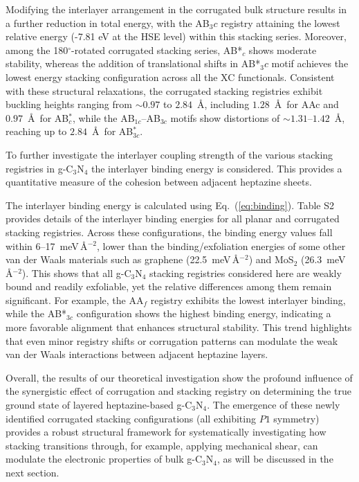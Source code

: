 Modifying the interlayer arrangement in the corrugated bulk structure results in a further reduction in total energy, with the AB$_3c$ registry attaining the lowest relative energy (-7.81 eV at the HSE level) within this stacking series. Moreover, among the 180$^\circ$-rotated corrugated stacking series, AB*$_c$ shows moderate stability, whereas the addition of translational shifts in AB*$_3c$ motif achieves the lowest energy stacking configuration across all the XC functionals. Consistent with these structural relaxations, the corrugated stacking registries exhibit buckling heights ranging from $\sim 0.97$ to $2.84$~\AA, including $1.28$~\AA\ for AAc and $0.97$~\AA\ for AB$^{*}_{c}$, while the AB$_{1c}$--AB$_{3c}$ motifs show distortions of $\sim 1.31$--$1.42$~\AA, reaching up to $2.84$~\AA\ for AB$^{*}_{3c}$.

To further investigate the interlayer coupling strength of the various stacking registries in g-C$_3$N$_4$ the interlayer binding energy is considered. This provides a quantitative measure of the cohesion between adjacent heptazine sheets. 

The interlayer binding energy is calculated using Eq.\ (\ref{eq:binding}). 
Table S2 provides details of the interlayer binding energies for all planar and corrugated stacking registries. Across these configurations, the binding energy values fall within 6--17~meV\,\AA$^{-2}$, lower than the binding/exfoliation energies of some other van der Waals materials such as graphene (22.5~meV\,\AA$^{-2}$) \cite{Huang2020UniversalCrystals} and MoS$_2$ (26.3~meV\,\AA$^{-2}$).\cite{Bian2022StrongMaterials} This shows that all g-C$_3$N$_4$ stacking registries considered here are weakly bound and readily exfoliable, yet the relative differences among them remain significant. For example, the AA$_f$ registry exhibits the lowest interlayer binding, while the AB*$_{3c}$ configuration shows the highest binding energy, indicating a more favorable alignment that enhances structural stability. This trend highlights that even minor registry shifts or corrugation patterns can modulate the weak van der Waals interactions between adjacent heptazine layers. 

Overall, the results of our theoretical investigation show the profound influence of the synergistic effect of corrugation and stacking registry on determining the true ground state of layered heptazine-based g-C$_3$N$_4$. The emergence of these newly identified corrugated stacking configurations (all exhibiting $P1$ symmetry) provides a robust structural framework for systematically investigating how stacking transitions through, for example, applying mechanical shear, can modulate the electronic properties of bulk g-C$_3$N$_4$, as will be discussed in the next section. 

